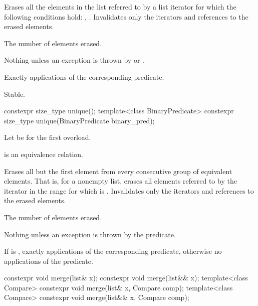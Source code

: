 \begin{itemdescr}
\pnum
\effects
Erases all the elements in the list referred to by a list iterator  for which the
following conditions hold: , .
Invalidates only the iterators and references to the erased elements.

\pnum
\returns
The number of elements erased.

\pnum
\throws
Nothing unless an exception is thrown by
or
.

\pnum
\complexity
Exactly
applications of the corresponding predicate.

\pnum
\remarks
Stable.
\end{itemdescr}

%
\begin{itemdecl}
constexpr size_type unique();
template<class BinaryPredicate> constexpr size_type unique(BinaryPredicate binary_pred);
\end{itemdecl}

\begin{itemdescr}
\pnum
Let  be  for the first overload.

\pnum
\expects
{} is an equivalence relation.

\pnum
\effects
Erases all but the first element from every
consecutive group of equivalent elements.
That is, for a nonempty list, erases all elements referred to
by the iterator  in the range 
for which  is .
Invalidates only the iterators and references to the erased elements.

\pnum
\returns
The number of elements erased.

\pnum
\throws
Nothing unless an exception is thrown by the predicate.

\pnum
\complexity
If  is ,
exactly  applications of the corresponding predicate,
otherwise no applications of the predicate.
\end{itemdescr}

%
\begin{itemdecl}
constexpr void merge(list& x);
constexpr void merge(list&& x);
template<class Compare> constexpr void merge(list& x, Compare comp);
template<class Compare> constexpr void merge(list&& x, Compare comp);
\end{itemdecl}

